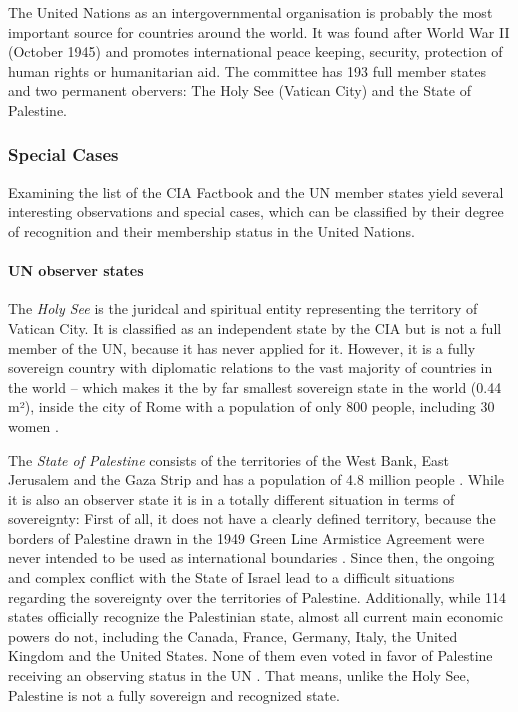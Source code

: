 The United Nations as an intergovernmental organisation is probably the most important source for countries around the world. It was found after World War II (October 1945) and promotes international peace keeping, security, protection of human rights or humanitarian aid. The committee has 193 full member states and two permanent obervers: The Holy See (Vatican City) and the State of Palestine. \cite{UNmembers}

\subsubsection{Special Cases} %
\label{ssub:special_cases}

Examining the list of the CIA Factbook and the UN member states yield several interesting observations and special cases, which can be classified by their degree of recognition and their membership status in the United Nations.


\paragraph{UN observer states} %
\label{par:un_observer_states}

The \emph{Holy See} is the juridcal and spiritual entity representing the territory of Vatican City. It is classified as an independent state by the CIA but is not a full member of the UN, because it has never applied for it. However, it is a fully sovereign country with diplomatic relations to the vast majority of countries in the world -- which makes it the by far smallest sovereign state in the world (0.44 m²), inside the city of Rome with a population of only 800 people, including 30 women \cite{VaticanPopulation}.

The \emph{State of Palestine} consists of the territories of the West Bank, East Jerusalem and the Gaza Strip and has a population of 4.8 million people \cite[as of 2016]{PalestinePopulation}. While it is also an observer state it is in a totally different situation in terms of sovereignty: First of all, it does not have a clearly defined territory, because the borders of Palestine drawn in the 1949 Green Line Armistice Agreement were never intended to be used as international boundaries \cite{PalestineTerritory}. Since then, the ongoing and complex conflict with the State of Israel lead to a difficult situations regarding the sovereignty over the territories of Palestine. Additionally, while 114 states officially recognize the Palestinian state, almost all current main economic powers do not, including the Canada, France, Germany, Italy, the United Kingdom and the United States. None of them even voted in favor of Palestine receiving an observing status in the UN \cite{PalestineUN}. That means, unlike the Holy See, Palestine is not a fully sovereign and recognized state.

